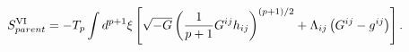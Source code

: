 \begin{equation}
S^{{\rm VI}}_{parent}=-T_{p}\int d^{p+1}{\xi}\left[\sqrt{-G}
\left(\frac{1}{p+1}G^{ij}h_{ij}\right)^{(p+1)/2}+{\Lambda}_{ij}\left(G^{ij}
-g^{ij}\right)\right].
\end{equation}

